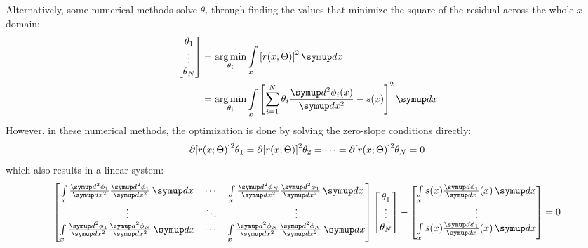 Alternatively, some numerical methods solve $\theta_i$ through finding the values that minimize the square of the residual across the whole $x$ domain:
\begin{equation}\label{eq:least-square-fem}
    \begin{aligned}
        \begin{bmatrix}
            \theta_1 \\ \vdots \\ \theta_N
        \end{bmatrix}
        & =
        \operatorname*{arg\,min}\limits_{\theta_i}
        \int\limits_{x}\left[r(x; \Theta)\right]^2\diff x \\
        & =
        \operatorname*{arg\,min}\limits_{\theta_i}
        \int\limits_{x}\left[\sum\limits_{i=1}^{N}\theta_i \frac{\diff^2 \phi_i(x)}{\diff x^2} - s(x)\right]^2\diff x
    \end{aligned}
\end{equation}
However, in these numerical methods, the optimization is done by solving the zero-slope conditions directly:
\begin{equation}
    \pdiff{\left[r(x; \Theta)\right]^2}{\theta_1} = 
    \pdiff{\left[r(x; \Theta)\right]^2}{\theta_2} = 
    \cdots =
    \pdiff{\left[r(x; \Theta)\right]^2}{\theta_N} = 
    0
\end{equation}
which also results in a linear system:
\begin{equation}\label{eq:spetral-least-equare}
    \begin{bmatrix}
        \int\limits_{x}
        \frac{\diff^2 \phi_1}{\diff x^2}
        \frac{\diff^2 \phi_1}{\diff x^2}
        \diff x
        &
        \cdots
        &
        \int\limits_{x}
        \frac{\diff^2 \phi_N}{\diff x^2}
        \frac{\diff^2 \phi_1}{\diff x^2}
        \diff x \\
        \vdots & \ddots & \vdots \\
        \int\limits_{x}
        \frac{\diff^2 \phi_1}{\diff x^2}
        \frac{\diff^2 \phi_N}{\diff x^2}
        \diff x
        &
        \cdots
        &
        \int\limits_{x}
        \frac{\diff^2 \phi_N}{\diff x^2}
        \frac{\diff^2 \phi_N}{\diff x^2}
        \diff x \\
    \end{bmatrix}
    \begin{bmatrix}
        \theta_1 \\ \vdots \\ \theta_N
    \end{bmatrix}
    - 
    \begin{bmatrix}
        \int\limits_{x}s(x)\frac{\diff \phi_1}{\diff x}(x) \diff x \\
        \vdots \\
        \int\limits_{x}s(x)\frac{\diff \phi_1}{\diff x}(x) \diff x
    \end{bmatrix}
    = 0
\end{equation}
